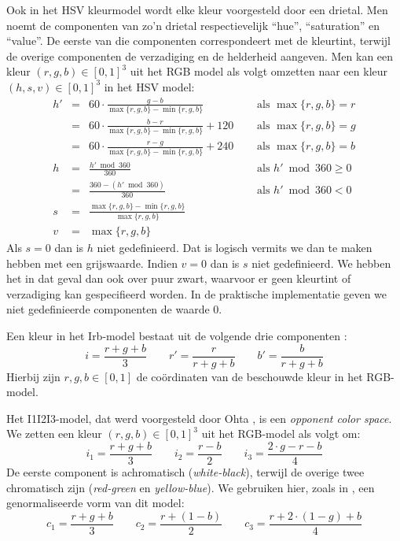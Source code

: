 Ook in het HSV kleurmodel \cite{tkalcic:colour_spaces} wordt elke kleur voorgesteld 
door een drietal. Men noemt de componenten van zo'n drietal respectievelijk 
``hue'', ``saturation'' en ``value''. De eerste van die componenten 
correspondeert met de kleurtint, terwijl de overige componenten de verzadiging 
en de helderheid aangeven. Men kan een kleur $(r,g,b) \in [0,1]^3$ uit het RGB 
model als volgt omzetten naar een kleur $(h,s,v) \in [0,1]^3$ in het HSV model: 
$$
\begin{array}{rcll}
h' & = & 60 \cdot \frac{g - b}{\max \{r,g,b\} - \min \{r,g,b\}}\quad & \textrm{ 
als } \max \{r,g,b\} = r \\[2pt] & = & 60 \cdot \frac{b - r}{\max \{r,g,b\} - 
\min \{r,g,b\}} + 120\quad & \textrm{ als } \max \{r,g,b\} = g \\[2pt] & = & 60 
\cdot \frac{r - g}{\max \{r,g,b\} - \min \{r,g,b\}} + 240\quad & \textrm{ als } 
\max \{r,g,b\} = b \\[6pt] h & = & \frac{h' \bmod 360}{360} & \textrm{ als } h' 
\bmod 360 \geq 0 \\[2pt] & = & \frac{360 - (h' \bmod 360)}{360} & \textrm{ als 
} h' \bmod 360 < 0 \\[6pt] s & = & \frac{\max \{r,g,b\} - \min \{r,g,b\}}{\max 
\{r,g,b\}} & \\[6pt] v & = & \max \{r,g,b\}
\end{array}
$$ Als $s=0$ dan is $h$ niet gedefinieerd. Dat is logisch vermits we dan te 
maken hebben met een grijswaarde. Indien $v=0$ dan is $s$ niet gedefinieerd. We 
hebben het in dat geval dan ook over puur zwart, waarvoor er geen kleurtint of 
verzadiging kan gespecifieerd worden. In de praktische implementatie geven we 
niet gedefinieerde componenten de waarde $0$.

Een kleur in het Irb-model bestaat uit de volgende drie componenten 
\cite{ohta:color_info_for_region_segm}: $$ i = \frac{r+g+b}{3} \qquad r' = 
\frac{r}{r+g+b} \qquad b' = \frac{b}{r+g+b} $$ Hierbij zijn $r,g,b \in [0,1]$ 
de co\"ordinaten van de beschouwde kleur in het RGB-model. 

Het I1I2I3-model, dat werd voorgesteld door Ohta 
\cite{ohta:color_info_for_region_segm}, is een \emph{opponent color space}. 
We zetten een kleur $(r,g,b) \in 
[0,1]^3$ uit het RGB-model als volgt om: $$
i_1 = \frac{r+g+b}{3} \qquad i_2 = \frac{r-b}{2} \qquad i_3 = \frac{2 \cdot g - 
r - b}{4}
$$ De eerste component is achromatisch (\emph{white-black}), terwijl de overige 
twee chromatisch zijn (\emph{red-green} en \emph{yellow-blue}).
We gebruiken hier, zoals in \cite{wang:cbir_using_daubechies_wavelets}, een 
genormaliseerde vorm van dit model: $$
c_1 = \frac{r+g+b}{3} \qquad c_2 = \frac{r + (1 - b)}{2} \qquad c_3 = \frac{r + 
2 \cdot (1 - g) + b}{4}
$$ 

